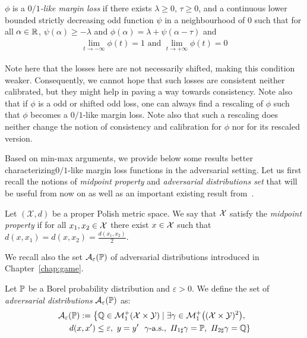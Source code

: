 \begin{definition}
\label{def:limits}
$\phi$ is a \emph{$0/1$-like margin loss} if there exists $\lambda\geq0$, $\tau\geq0$, and a continuous lower bounded strictly decreasing odd function \textcolor{black}{$\psi$} in a neighbourhood of $0$ such that for all $\alpha\in\mathbb{R}$, $\psi(\alpha)\geq -\lambda$ and $\phi(\alpha) = \lambda+\psi(\alpha-\tau)$ and
\begin{align*}
\lim_{t\to-\infty}\phi(t)=1\text{ and }\lim_{t\to+\infty}\phi(t)=0
\end{align*}
\end{definition}

Note here that the losses here are not necessarily shifted, making this condition weaker. Consequently, we cannot hope that such losses are consistent neither calibrated, but they might help in paving a way towards consistency.  Note also that if $\phi$ is a odd or shifted odd loss, one can always find a rescaling of $\phi$ such that $\phi$ becomes a $0/1$-like margin loss. Note also that such a rescaling does neither change the notion of consistency and calibration for $\phi$ nor for its rescaled version.






Based on min-max arguments, we provide below some results better characterizing$0/1$-like margin loss functions in the adversarial setting. Let us first recall the notions of \emph{midpoint property} and \emph{adversarial distributions set} that will be useful from now on as well as an important existing result from~\citet{pydi2021many}. 

\begin{definition}
Let $(\mathcal{X},d)$ be a proper Polish metric space. We say that $\mathcal{X}$ satisfy the \emph{midpoint property} if for all $x_1,x_2\in\mathcal{X}$ there exist $x\in\mathcal{X}$ such that $d(x,x_1) = d(x,x_2) =\frac{d(x_1,x_2)}{2}$.
\end{definition}
We recall also the set $\mathcal{A}_\varepsilon(\mathbb{P})$ of adversarial distributions introduced in Chapter~\ref{chap:game}.
\begin{definition}
Let $\mathbb{P}$ be a Borel probability distribution and $\varepsilon>0$.
We define the set of \emph{adversarial distributions} $\mathcal{A}_\varepsilon(\mathbb{P})$ as: 
\begin{align*}
\mathcal{A}_{\varepsilon}&(\PP) := \left\{\QQ\in\mathcal{M}^+_1(\mathcal{X}\times\mathcal{Y})\mid\exists \gamma\in\mathcal{M}^+_1\left((\mathcal{X}\times\mathcal{Y})^2\right),\right.\\
&\left.d(x,x')\leq\varepsilon,~y=y'~~ \gamma\text{-a.s.},~\Pi_{1\sharp}\gamma=\PP,~\Pi_{2\sharp}\gamma=\QQ\right\} 
\end{align*}

\end{definition}


